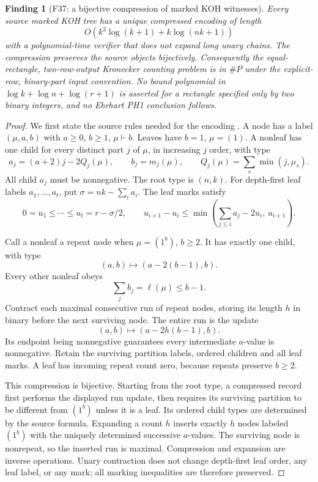 \documentclass[11pt,a4paper]{article}
\newcommand{\fid}[1]{\textsf{#1}}\newcommand{\gate}[1]{\textsf{#1}}
\theoremstyle{named}\newtheorem{finding}{Finding}[section]
\theoremstyle{definition}\newtheorem{definition}[finding]{Definition}
\theoremstyle{remark}\newtheorem{remark}[finding]{Remark}
\begin{document}
\begin{finding}[\fid{F37}: a bijective compression of marked KOH witnesses]\label{f:kohcompression}
Every source marked KOH tree has a unique compressed encoding of length
\[
 O\!\left(k^2\log(k+1)+k\log(nk+1)\right)
\]
with a polynomial-time verifier that does not expand long unary chains.
The compression preserves the source objects bijectively.
Consequently the equal-rectangle, two-row-output Kronecker counting
problem is in $\#P$ under the explicit-row, binary-part input convention.
No bound polynomial in $\log k+\log n+\log(r+1)$ is asserted for a
rectangle specified only by two binary integers, and no Ehrhart PH1
conclusion follows.
\end{finding}
\begin{proof}
We first state the source rules needed for the encoding
\cite[Definition~3.2, p.~6; Definition~4.4, p.~10]{PPS}.
A node has a label $(\mu,a,b)$ with $a\ge0$, $b\ge1$, $\mu\vdash b$.
Leaves have $b=1$, $\mu=(1)$. A nonleaf has one child for every
distinct part $j$ of $\mu$, in increasing $j$ order, with type
\[
 a_j=(a+2)j-2Q_j(\mu),\qquad b_j=m_j(\mu),\qquad
 Q_j(\mu)=\sum_s\min(j,\mu_s).
\]
All child $a_j$ must be nonnegative. The root type is $(n,k)$.
For depth-first leaf labels $a_1,\ldots,a_t$, put
$\sigma=nk-\sum_i a_i$. The leaf marks satisfy
\[
 0=u_1\le\cdots\le u_t=r-\sigma/2,\qquad
 u_{i+1}-u_i\le
 \min\left(\sum_{j\le i}a_j-2u_i,\ a_{i+1}\right).
\]

Call a nonleaf a repeat node when $\mu=(1^b)$, $b\ge2$.
It has exactly one child, with type
\[
 (a,b)\longmapsto(a-2(b-1),b).
\]
Every other nonleaf obeys
\[
 \sum_j b_j=\ell(\mu)\le b-1.
\]
Contract each maximal consecutive run of repeat nodes, storing its
length $h$ in binary before the next surviving node. The entire run
is the update
\[
 (a,b)\longmapsto(a-2h(b-1),b).
\]
Its endpoint being nonnegative guarantees every intermediate
$a$-value is nonnegative. Retain the surviving partition labels,
ordered children and all leaf marks. A leaf has incoming repeat
count zero, because repeats preserve $b\ge2$.

This compression is bijective. Starting from the root type, a
compressed record first performs the displayed run update, then
requires its surviving partition to be different from $(1^b)$
unless it is a leaf. Its ordered child types are determined by the
source formula. Expanding a count $h$ inserts exactly $h$ nodes
labeled $(1^b)$ with the uniquely determined successive $a$-values.
The surviving node is nonrepeat, so the inserted run is maximal.
Compression and expansion are inverse operations. Unary contraction
does not change depth-first leaf order, any leaf label, or any mark;
all marking inequalities are therefore preserved.


\end{proof}
\end{document}
